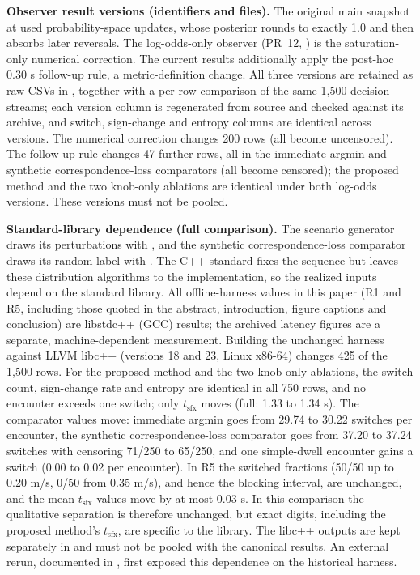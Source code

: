 \noindent\textbf{Observer result versions (identifiers and files).} The original main snapshot at  used probability-space updates, whose posterior rounds to exactly 1.0 and then absorbs later reversals. The log-odds-only observer (PR~12, ) is the saturation-only numerical correction. The current results additionally apply the post-hoc 0.30 s follow-up rule, a metric-definition change. All three versions are retained as raw CSVs in , together with a per-row comparison of the same 1,500 decision streams; each version column is regenerated from source and checked against its archive, and switch, sign-change and entropy columns are identical across versions. The numerical correction changes 200 rows (all become uncensored). The follow-up rule changes 47 further rows, all in the immediate-argmin and synthetic correspondence-loss comparators (all become censored); the proposed method and the two knob-only ablations are identical under both log-odds versions. These versions must not be pooled.

\noindent\textbf{Standard-library dependence (full comparison).} The scenario generator draws its perturbations with , and the synthetic correspondence-loss comparator draws its random label with . The C++ standard fixes the  sequence but leaves these distribution algorithms to the implementation, so the realized inputs depend on the standard library. All offline-harness values in this paper (R1 and R5, including those quoted in the abstract, introduction, figure captions and conclusion) are libstdc++ (GCC) results; the archived latency figures are a separate, machine-dependent measurement. Building the unchanged harness against LLVM libc++ (versions 18 and 23, Linux x86-64) changes 425 of the 1,500 rows. For the proposed method and the two knob-only ablations, the switch count, sign-change rate and entropy are identical in all 750 rows, and no encounter exceeds one switch; only $t_{\text{sfx}}$ moves (full: 1.33 to 1.34 s). The comparator values move: immediate argmin goes from 29.74 to 30.22 switches per encounter, the synthetic correspondence-loss comparator goes from 37.20 to 37.24 switches with censoring 71/250 to 65/250, and one simple-dwell  encounter gains a switch (0.00 to 0.02 per encounter). In R5 the switched fractions (50/50 up to 0.20 m/s, 0/50 from 0.35 m/s), and hence the blocking interval, are unchanged, and the mean $t_{\text{sfx}}$ values move by at most 0.03 s. In this comparison the qualitative separation is therefore unchanged, but exact digits, including the proposed method's $t_{\text{sfx}}$, are specific to the library. The libc++ outputs are kept separately in  and must not be pooled with the canonical results. An external rerun, documented in , first exposed this dependence on the historical harness.

